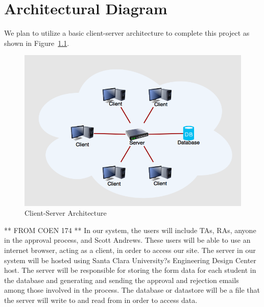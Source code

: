 \chapter{Architectural Diagram}

We plan to utilize a basic client-server architecture to complete this project as shown in Figure~\ref{fig:arch}.

\begin{figure}[htb]
\centering
\includegraphics[width=\textwidth]{arch.png}
\caption{Client-Server Architecture}
\label{fig:arch}
\end{figure}

** FROM COEN 174 **
In our system, the users will include TAs, RAs, anyone in the approval process, and Scott Andrews. These users will be able to use an internet browser, acting as a client, in order to access our site. The server in our system will be hosted using Santa Clara University?s Engineering Design Center host. The server will be responsible for storing the form data for each student in the database and generating and sending the approval and rejection emails among those involved in the process. The database or datastore will be a file that the server will write to and read from in order to access data.